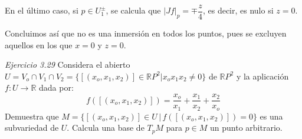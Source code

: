 \begin{sol}
    En el \'ultimo caso, si $p \in U_1^{\pm}$, se calcula que $|Jf|_p = \mp \dfrac{z}{4}$, es decir, es nulo si $z=0$. 

    Concluimos as\'i que no es una inmersi\'on en todos los puntos, pues se excluyen aquellos en los que $x=0$ y $z=0$.
\end{sol}
\begin{ejer}
    [2] \textit{Ejercicio 3.29} Considera el abierto $U = V_o\cap V_1 \cap V_2 = \{[(x_o, x_1, x_2)] \in \mathbb RP^2 | x_ox_1x_2 \neq 0\}$ de $\mathbb RP^2$ y la aplicaci\'on $f : U \to \mathbb R$ dada por:
    $$f([(x_o,x_1,x_2)]) = \dfrac{x_o}{x_1}+\dfrac{x_1}{x_2}+\dfrac{x_2}{x_o}$$
    Demuestra que $M = \{[(x_o, x_1, x_2)] \in U \,|\,  f([(x_o, x_1, x_2)]) = 0\}$ es una subvariedad de $U$. Calcula una base de $T_pM$ para $p \in M$ un punto arbitrario.
\end{ejer}
